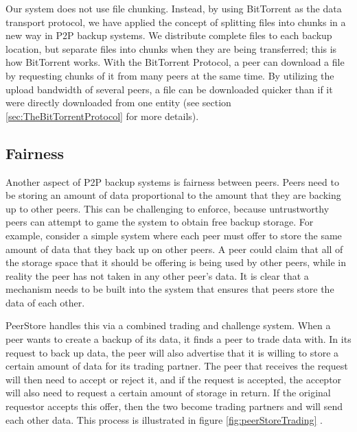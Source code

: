 \documentclass[12pt]{report}
\begin{document}
Our system does not use file chunking. Instead, by using BitTorrent as the data transport protocol, we have applied the concept of splitting files into chunks in a new way in P2P backup systems. We distribute complete files to each backup location, but separate files into chunks when they are being transferred; this is how BitTorrent works. With the BitTorrent Protocol, a peer can download a file by requesting chunks of it from many peers at the same time. By utilizing the upload bandwidth of several peers, a file can be downloaded quicker than if it were directly downloaded from one entity (see section \ref{sec:TheBitTorrentProtocol} for more details).

\subsection{Fairness} \label{sec:BackgroundFairness}
Another aspect of P2P backup systems is fairness between peers. Peers need to be storing an amount of data proportional to the amount that they are backing up to other peers. This can be challenging to enforce, because untrustworthy peers can attempt to game the system to obtain free backup storage. For example, consider a simple system where each peer must offer to store the same amount of data that they back up on other peers. A peer could claim that all of the storage space that it should be offering is being used by other peers, while in reality the peer has not taken in any other peer's data. It is clear that a mechanism needs to be built into the system that ensures that peers store the data of each other.

PeerStore handles this via a combined trading and challenge system. When a peer wants to create a backup of its data, it finds a peer to trade data with. In its request to back up data, the peer will also advertise that it is willing to store a certain amount of data for its trading partner. The peer that receives the request will then need to accept or reject it, and if the request is accepted, the acceptor will also need to request a certain amount of storage in return. If the original requestor accepts this offer, then the two become trading partners and will send each other data. This process is illustrated in figure \ref{fig:peerStoreTrading} \cite{PeerStore}.
\end{document}
